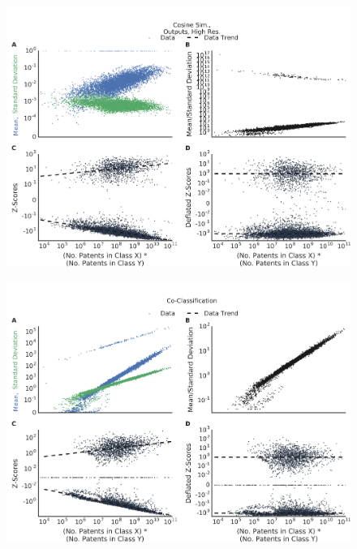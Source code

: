 \documentclass[]{svjour3}
\begin{document}
\begin{figure}[]
\begin{center}
\includegraphics[width=\textwidth]{figs/Z_Score_Inflation_Cosine_Sim_Outputs_High_Res_IPC.png} 
\end{center}
\caption{}
\end{figure}

\begin{figure}[]
\begin{center}
\includegraphics[width=\textwidth]{figs/Z_Score_Inflation_Co-Classification_IPC.png} 
\end{center}
\caption{}
\end{figure}
\end{document}
